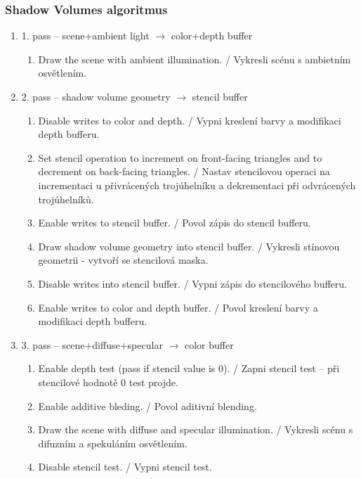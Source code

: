 \begin{frame}\frametitle{Shadow Volumes algoritmus}\scriptsize
  \begin{enumerate}\scriptsize
    \item 1. pass -- scene+ambient light $\rightarrow$ color+depth buffer
      \begin{enumerate}\scriptsize
        \item Draw the scene with ambient illumination. / Vykresli scénu s ambietním osvětlením.
      \end{enumerate}

    \item 2. pass -- shadow volume geometry $\rightarrow$ stencil buffer
      \begin{enumerate}\scriptsize
        \item Disable writes to color and depth. / Vypni kreslení barvy a modifikaci depth bufferu.
        \item Set stencil operation to increment on front-facing triangles and to decrement on back-facing triangles. / Nastav stencilovou operaci na incrementaci u přivrácených trojúhelníku a dekrementaci při odvrácených trojúhelníků.
        \item Enable writes to stencil buffer. / Povol zápis do stencil bufferu.
        \item Draw shadow volume geometry into stencil buffer. / Vykresli stínovou geometrii - vytvoří se stencilová maska.
        \item Disable writes into stencil buffer. / Vypni zápis do stencilového bufferu.
        \item Enable writes to color and depth buffer. / Povol kreslení barvy a modifikaci depth bufferu.
      \end{enumerate}

    \item 3. pass -- scene+diffuse+specular $\rightarrow$ color buffer
      \begin{enumerate}\scriptsize
        \item Enable depth test (pass if stencil value is 0). / Zapni stencil test -- při stencilové hodnotě 0 test projde.
        \item Enable additive bleding. / Povol aditivní blending.
        \item Draw the scene with diffuse and specular illumination. / Vykresli scénu s difuzním a spekuláním osvětlením.
        \item Disable stencil test. / Vypni stencil test.
      \end{enumerate}
  \end{enumerate}
\end{frame}

